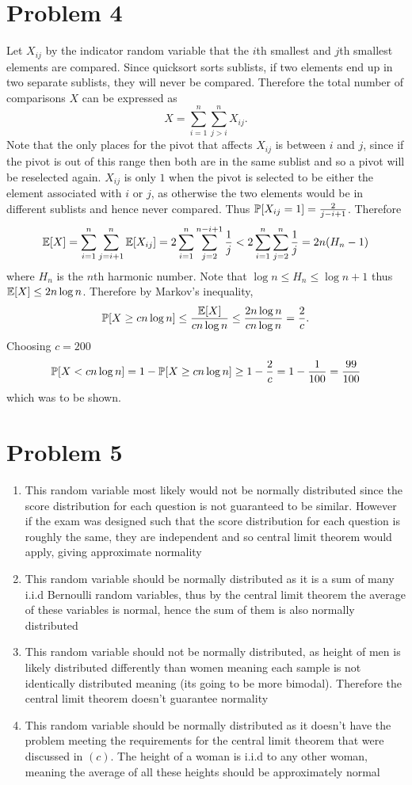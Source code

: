 \documentclass{eeleyes}
\begin{document}
\section*{Problem 4}
Let $X_{ij}$ by the indicator random variable that the $i$th smallest and $j$th smallest elements are compared. Since quicksort sorts sublists, if two elements end up in two separate sublists, they will never be compared. Therefore the total number of comparisons $X$ can be expressed as
\[
    X = \sum_{i=1}^n \sum_{j > i}^n X_{ij}
.\]
Note that the only places for the pivot that affects $X_{ij}$ is between $i$ and $j$, since if the pivot is out of this range then both are in the same sublist and so a pivot will be reselected again. $X_{ij}$ is only $1$ when the pivot is selected to be either the element associated with $i$ or $j$, as otherwise the two elements would be in different sublists and hence never compared. Thus $\prob{X_{ij} = 1} = \frac{2}{j - i + 1}$. Therefore
\[
    \expp{X} = \sum_{i=1}^n \sum_{j = i + 1}^n \expp{X_{ij}} = 2 \sum_{i=1}^n \sum_{j=2}^{n-i+1} \frac{1}{j} < 2 \sum_{i=1}^n \sum_{j=2}^n \frac{1}{j} = 2n (H_n - 1)
\]
where $H_n$ is the $n$th harmonic number. Note that $\log n \leq H_n \leq \log n + 1$ thus $\expp{X} \leq 2n \log n$. Therefore by Markov's inequality,
\[
    \prob{X \geq c n \log n} \leq \frac{\expp{X}}{c n \log n} \leq \frac{2n \log n}{c n \log n} = \frac{2}{c}
.\]
Choosing $c = 200$
\[
    \prob{X < c n \log n} = 1 - \prob{X \geq c n \log n} \geq 1 - \frac{2}{c} = 1 - \frac{1}{100} = \frac{99}{100}
\]
which was to be shown.

\section*{Problem 5}
\begin{enumerate}[label=\alph*)]
    \item This random variable most likely would not be normally distributed since the score distribution for each question is not guaranteed to be similar. However if the exam was designed such that the score distribution for each question is roughly the same, they are independent and so central limit theorem would apply, giving approximate normality
    \item This random variable should be normally distributed as it is a sum of many i.i.d Bernoulli random variables, thus by the central limit theorem the average of these variables is normal, hence the sum of them is also normally distributed
    \item This random variable should not be normally distributed, as height of men is likely distributed differently than women meaning each sample is not identically distributed meaning (its going to be more bimodal). Therefore the central limit theorem doesn't guarantee normality
    \item This random variable should be normally distributed as it doesn't have the problem meeting the requirements for the central limit theorem that were discussed in $(c)$. The height of a woman is i.i.d to any other woman, meaning the average of all these heights should be approximately normal
\end{enumerate}
\end{document}
